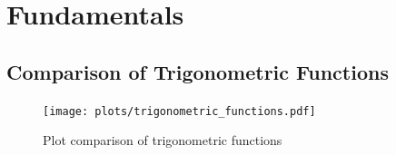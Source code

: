 
\label{app:appendix}


%  
%
%





\chapter{Fundamentals}

\section{Comparison of Trigonometric Functions}
\label{app:trogonometric-func-comp}

\begin{figure}[H]
    \centering
    \texttt{[image: plots/trigonometric\_functions.pdf]}
    \caption[Plot comparison of trigonometric functions]{Plot comparison of trigonometric functions}
    \label{fig:trigonometric-func}
\end{figure}

